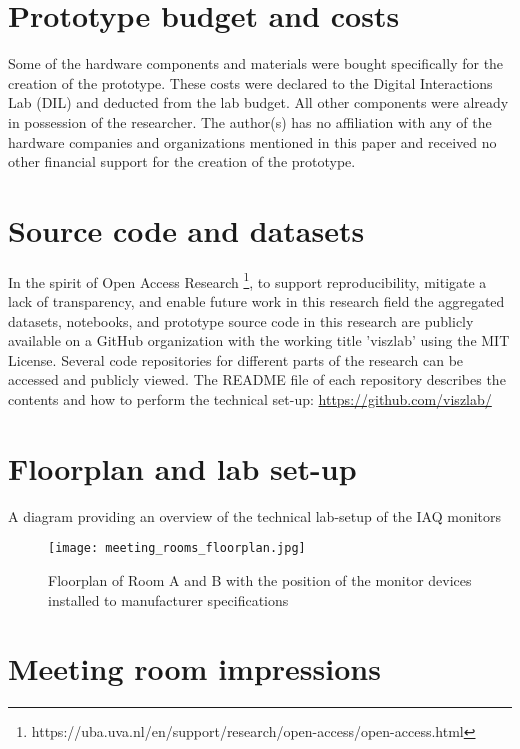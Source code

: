 \begin{appendices}
\section{Prototype budget and costs}
\label{appendix:ethical}

Some of the hardware components and materials were bought specifically for the creation of the prototype. These costs were declared to the Digital Interactions Lab (DIL) and deducted from the lab budget. All other components were already in possession of the researcher. The author(s) has no affiliation with any of the hardware companies and organizations mentioned in this paper and received no other financial support for the creation of the prototype.

\section{Source code and datasets}
\label{appendix:source}

In the spirit of Open Access Research \footnote{https://uba.uva.nl/en/support/research/open-access/open-access.html}, to support reproducibility, mitigate a lack of transparency, and enable future work in this research field the aggregated datasets, notebooks, and prototype source code in this research are publicly available on a GitHub organization with the working title 'viszlab' using the MIT License. Several code repositories for different parts of the research can be accessed and publicly viewed. The README file of each repository describes the contents and how to perform the technical set-up: \underline{https://github.com/viszlab/}

\pagebreak

\section{Floorplan and lab set-up}
\label{appendix:floorplan}

A diagram providing an overview of the technical lab-setup of the IAQ monitors

\begin{figure}[H]
    \centering
    \texttt{[image: meeting\_rooms\_floorplan.jpg]}
    \caption{Floorplan of Room A and B with the position of the monitor devices installed to manufacturer specifications}
    \label{fig:timeline}
\end{figure}

\section{Meeting room impressions}
\label{appendix:meetings}


\end{appendices}
